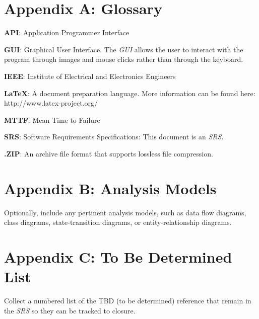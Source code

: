 \documentclass[a4paper, 12pt]{article}
\begin{document}
\section{Appendix A: Glossary} \label{appendixa}
\begin{adjustwidth}{1em}{0pt}
\textbf{API}: Application Programmer Interface \newline

\noindent \textbf{GUI}: Graphical User Interface. The \textit{GUI} allows the user to interact with the program through images and mouse clicks rather than through the keyboard. \newline

\noindent \textbf{IEEE}: Institute of Electrical and Electronics Engineers \newline

\noindent \textbf{\LaTeX}: A document preparation language. More information can be found here: http://www.latex-project.org/ \newline

\noindent \textbf{MTTF}: Mean Time to Failure \newline

\noindent \textbf{SRS}: Software Requirements Specifications: This document is an \textit{SRS}. \newline

\noindent \textbf{.ZIP}: An archive file format that supports lossless file compression. \newline
\end{adjustwidth}

\section{Appendix B: Analysis Models} \label{appexdixb}
\begin{adjustwidth}{1em}{0pt}
Optionally, include any pertinent analysis models, such as data flow diagrams, class diagrams, state-transition diagrams, or entity-relationship diagrams.
\end{adjustwidth}

\section{Appendix C: To Be Determined List} \label{appendixc}
\begin{adjustwidth}{1em}{0pt}
Collect a numbered list of the TBD (to be determined) reference that remain in the \textit{SRS} so they can be tracked to closure. 
\end{adjustwidth}
\end{document}
